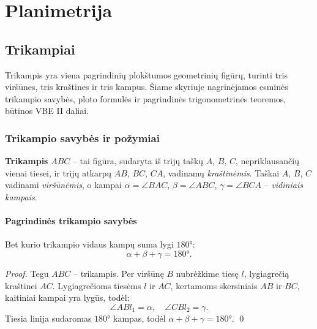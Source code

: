 \chapter{Planimetrija}

\section{Trikampiai}

Trikampis yra viena pagrindinių plokštumos geometrinių figūrų, turinti tris viršūnes,
tris kraštines ir tris kampus. Šiame skyriuje nagrinėjamos esminės trikampio savybės,
ploto formulės ir pagrindinės trigonometrinės teoremos, būtinos VBE II daliai.

\subsection{Trikampio savybės ir požymiai}

\begin{definition}
\textbf{Trikampis} $ABC$ – tai figūra, sudaryta iš trijų taškų $A$, $B$, $C$,
nepriklausančių vienai tiesei, ir trijų atkarpų $AB$, $BC$, $CA$, vadinamų
\emph{kraštinėmis}. Taškai $A$, $B$, $C$ vadinami \emph{viršūnėmis}, o kampai
$\alpha = \angle BAC$, $\beta = \angle ABC$, $\gamma = \angle BCA$ – \emph{vidiniais kampais}.
\end{definition}

\subsubsection*{Pagrindinės trikampio savybės}

\begin{theorem}
Bet kurio trikampio vidaus kampų suma lygi $180°$:
\[
\alpha + \beta + \gamma = 180°.
\]
\end{theorem}

\begin{proof}
Tegu $ABC$ – trikampis. Per viršūnę $B$ nubrėžkime tiesę $l$, lygiagrečią kraštinei $AC$.
Lygiagrečioms tiesėms $l$ ir $AC$, kertamoms skersiniais $AB$ ir $BC$,
kaitiniai kampai yra lygūs, todėl:
\[
\angle ABl_1 = \alpha, \quad \angle CBl_2 = \gamma.
\]
Tiesia linija sudaromas $180°$ kampas, todėl
$\alpha + \beta + \gamma = 180°$. \qed
\end{proof}

